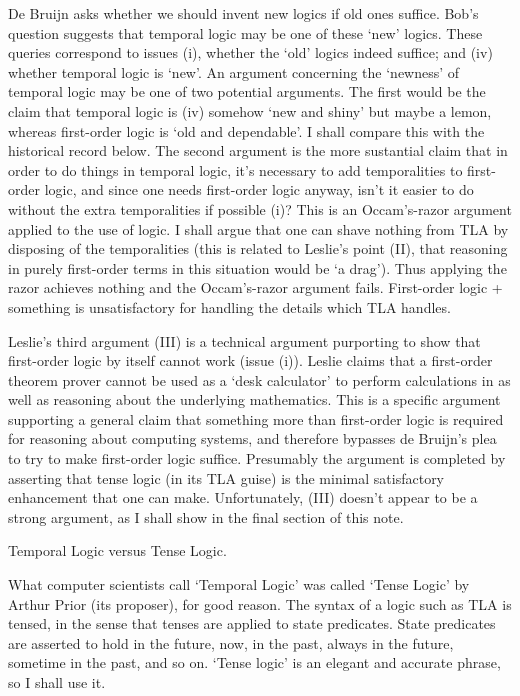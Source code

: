 \begin{spec}
De Bruijn asks whether we should invent new logics if old ones
suffice. Bob's question suggests that temporal logic may be one of
these `new' logics.  These queries correspond to issues (i), whether
the `old' logics indeed suffice; and (iv) whether temporal logic is
`new'.  An argument concerning the `newness' of temporal logic may
be one of two potential arguments.  The first would be the claim
that temporal logic is (iv) somehow `new and shiny' but maybe a
lemon, whereas first-order logic is `old and dependable'.  I shall
compare this with the historical record below.  The second argument
is the more sustantial claim that in order to do things in temporal
logic, it's necessary to add temporalities to first-order logic, and
since one needs first-order logic anyway, isn't it easier to do
without the extra temporalities if possible (i)?  This is an
Occam's-razor argument applied to the use of logic.  I shall argue
that one can shave nothing from TLA by disposing of the
temporalities (this is related to Leslie's point (II), that
reasoning in purely first-order terms in this situation would be `a
drag').  Thus applying the razor achieves nothing and the
Occam's-razor argument fails.  First-order logic + something is
unsatisfactory for handling the details which TLA handles.

Leslie's third argument (III) is a technical argument purporting to
show that first-order logic by itself cannot work (issue (i)).
Leslie claims that a first-order theorem prover cannot be used as a
`desk calculator' to perform calculations in as well as reasoning
about the underlying mathematics. This is a specific argument
supporting a general claim that something more than first-order
logic is required for reasoning about computing systems, and
therefore bypasses de Bruijn's plea to try to make first-order logic
suffice.  Presumably the argument is completed by asserting that
tense logic (in its TLA guise) is the minimal satisfactory
enhancement that one can make.  Unfortunately, (III) doesn't appear
to be a strong argument, as I shall show in the final section of
this note.

Temporal Logic versus Tense Logic.

What computer scientists call `Temporal Logic' was called `Tense
Logic' by Arthur Prior (its proposer), for good reason. The syntax
of a logic such as TLA is tensed, in the sense that tenses are
applied to state predicates.  State predicates are asserted to hold
in the future, now, in the past, always in the future, sometime in
the past, and so on. `Tense logic' is an elegant and accurate
phrase, so I shall use it.


\end{spec}
